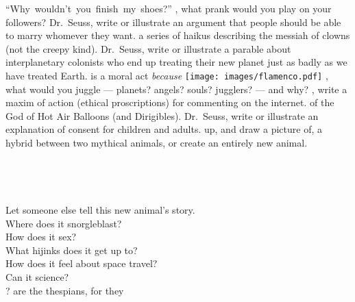 \hbox{\footnotesize{``Why wouldn't you finish my shoes?''}}
\bversenonum {}, what prank would you play on your followers?
\bversenonum {} Dr.~Seuss, write or illustrate an argument that people should be able to marry whomever they want.
\bversenonum {} a series of haikus describing the messiah of clowns (not the creepy kind).
\bversenonum {} Dr.~Seuss, write or illustrate a parable about interplanetary colonists who end up treating their new planet just as badly as we have treated Earth.
\bversenonum {} is a moral act \textit{because}
\newpage
\hfill\texttt{[image: images/flamenco.pdf]}
\newpage
\bversenonum {}, what would you juggle --- planets? angels? souls? jugglers? --- and why?
\bversenonum {}, write a maxim of action (ethical proscriptions) for commenting on the internet.
\bversenonum {} of the God of Hot Air Balloons (and Dirigibles).
\bversenonum {} Dr.~Seuss, write or illustrate an explanation of consent for children and adults.
\bversenonum {} up, and draw a picture of, a hybrid between two mythical animals, or create an entirely new animal.
\\
\\
\\
\\
\\
\bverse Let someone else tell this new animal's story.
\\
\bverse Where does it snorgleblast?
\\
\bverse How does it sex?
\\
\bverse What hijinks does it get up to?
\\
\bverse How does it feel about space travel?
\\
\bverse Can it science?
\\
\bverse ?
\bversenonum {} are the thespians, for they\\
\\
\\
\\
\\
